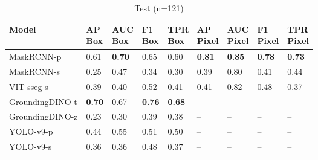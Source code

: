 \begin{table}[t]
  \hfill %

    \begin{subtable}[b]{\textwidth} %
    \caption{Test (n=121)}
    \centering
        \begin{tabular}{lllllllll}
        \toprule
         Model      & \makecell{AP\\Box}   & \makecell{AUC\\Box}   & \makecell{F1\\Box}   & \makecell{TPR\\Box}   & \makecell{AP\\Pixel}   & \makecell{AUC\\Pixel}   & \makecell{F1\\Pixel}   & \makecell{TPR\\Pixel}     \\
        \midrule
         MaskRCNN-p      & 0.61          & \textbf{0.70} & 0.65          & 0.60          & \textbf{0.81} & \textbf{0.85} & \textbf{0.78} & \textbf{0.73} \\
         MaskRCNN-s      & 0.25          & 0.47          & 0.34          & 0.30          & 0.39          & 0.80          & 0.41          & 0.44          \\
         VIT-sseg-s      & 0.39          & 0.40          & 0.52          & 0.41          & 0.41          & 0.82          & 0.48          & 0.37          \\
         GroundingDINO-t & \textbf{0.70} & 0.67          & \textbf{0.76} & \textbf{0.68} & --            & --            & --            & --            \\
         GroundingDINO-z & 0.23          & 0.30          & 0.39          & 0.38          & --            & --            & --            & --            \\
         YOLO-v9-p       & 0.44          & 0.55          & 0.51          & 0.50          & --            & --            & --            & --            \\
         YOLO-v9-s       & 0.36          & 0.36          & 0.48          & 0.37          & --            & --            & --            & --            \\
        \bottomrule
        \end{tabular}
    \end{subtable}

\end{table}



